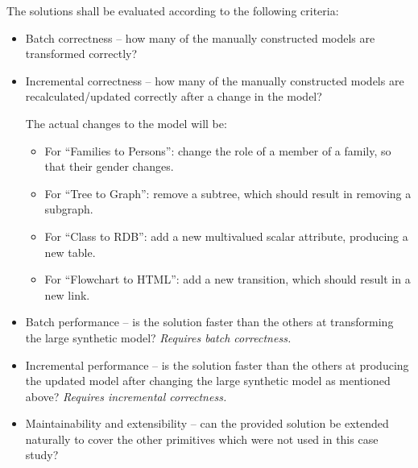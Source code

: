 \documentclass[a4paper]{scrartcl}
\begin{document}
The solutions shall be evaluated according to the following criteria:
\begin{itemize}
\item Batch correctness -- how many of the manually constructed models
  are transformed correctly?

\item Incremental correctness -- how many of the manually constructed
  models are recalculated/updated correctly after a change in the
  model?

  The actual changes to the model will be:
  \begin{itemize}
  \item For ``Families to Persons'': change the role of a member of a
    family, so that their gender changes.
  \item For ``Tree to Graph'': remove a subtree, which should result
    in removing a subgraph.
  \item For ``Class to RDB'': add a new multivalued scalar attribute,
    producing a new table.
  \item For ``Flowchart to HTML'': add a new transition, which should
    result in a new link.
  \end{itemize}

\item Batch performance -- is the solution faster than the others at
  transforming the large synthetic model? \emph{Requires batch
    correctness.}

\item Incremental performance -- is the solution faster than the
  others at producing the updated model after changing the large
  synthetic model as mentioned above? \emph{Requires incremental
  correctness.}

\item Maintainability and extensibility -- can the provided solution
  be extended naturally to cover the other primitives which were not
  used in this case study?
\end{itemize}



\end{document}
